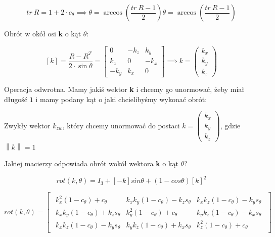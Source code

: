 \documentclass{article}
\newcommand{\norm}[1]{\left\lVert#1\right\rVert}
\begin{document}
\Large
$$
    tr \ R=1+2\cdot c_{\theta} \implies \theta=\arccos\left(\frac{tr \ R-1}{2}\right)
    \theta = \arccos\left(\frac{tr \ R - 1}{2}\right)
$$
\normalsize

Obrót w okół osi {\bf k} o kąt $\theta$:

\Large
$$
    \left[k\right]=\frac{R-R^{T}}{2\cdot\sin\theta}=
    \begin{bmatrix}
        0      & -k_{z} & k_{y}  \\[0.3em]
        k_{z}  & 0      & -k_{x} \\[0.3em]
        -k_{y} & k_{x}  & 0
    \end{bmatrix}
    \implies
    k =
    \begin{pmatrix}
        k_{x} \\
        k_{y} \\
        k_{z}
    \end{pmatrix}
$$
\normalsize

\newpage

Operacja odwrotna.
Mamy jakiś wektor {\bf k} i chcemy go unormować, żeby miał długość $1$ i mamy
podany kąt o jaki chcielibyśmy wykonać obrót:


Zwykły wektor $k_{zw}$, który chcemy unormować do postaci $k =
    \begin{pmatrix}
        k_{x} \\
        k_{y} \\
        k_{z}
    \end{pmatrix}$, gdzie $\norm{k}=1$

Jakiej macierzy odpowiada obrót wokół wektora {\bf k} o kąt $\theta$?


\Large
$$
    rot(k, \theta ) = I_{3} + [-k] sin \theta + (1-cos \theta ) [k]^2
$$

$$
    rot(k, \theta)=
    \begin{bmatrix}
        \begin{array}{c|c|c}
            k_{x}^{2}(1-c_{\theta})+c_{\theta}       & k_{x}k_{y}(1-c_{\theta})-k_{z}s_{\theta} & k_{x}k_{z}(1-c_{\theta})-k_{y}s_{\theta} \\[0.3em]
            \hline
            k_{x}k_{y}(1-c_{\theta})+k_{z}s_{\theta} & k_{y}^{2}(1-c_{\theta})+c_{\theta}       & k_{y}k_{z}(1-c_{\theta})-k_{x}s_{\theta} \\[0.3em]
            \hline
            k_{x}k_{z}(1-c_{\theta})-k_{y}s_{\theta} & k_{y}k_{z}(1-c_{\theta})+k_{x}s_{\theta} & k_{z}^{2}(1-c_{\theta})+c_{\theta}
        \end{array}
    \end{bmatrix}
$$
\normalsize
\end{document}
